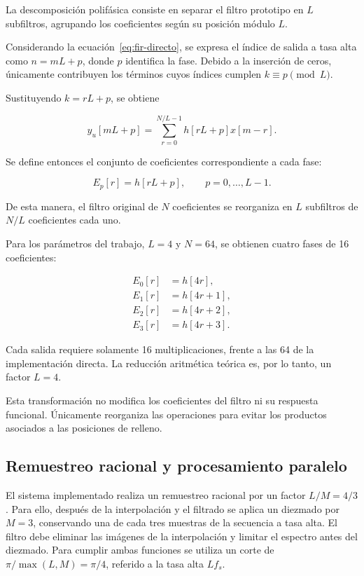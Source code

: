 \documentclass[10pt,a4paper]{article}
\begin{document}
La descomposición polifásica consiste en separar el filtro prototipo
en $L$ subfiltros, agrupando los coeficientes según su posición
módulo $L$.

Considerando la ecuación~\eqref{eq:fir-directo}, se expresa el índice
de salida a tasa alta como $n=mL+p$, donde $p$ identifica la fase.
Debido a la inserción de ceros, únicamente contribuyen los términos
cuyos índices cumplen $k \equiv p \pmod L$.

Sustituyendo $k=rL+p$, se obtiene

\begin{equation}
y_u[mL+p]=
\sum_{r=0}^{N/L-1}h[rL+p]x[m-r].
\label{eq:polyphase}
\end{equation}

Se define entonces el conjunto de coeficientes correspondiente a
cada fase:

\begin{equation}
E_p[r]=h[rL+p],
\qquad p=0,\ldots,L-1.
\label{eq:phase-coefficients}
\end{equation}

De esta manera, el filtro original de $N$ coeficientes se reorganiza
en $L$ subfiltros de $N/L$ coeficientes cada uno.

Para los parámetros del trabajo, $L=4$ y $N=64$, se obtienen cuatro
fases de 16 coeficientes:

\begin{align}
E_0[r] &= h[4r], \nonumber\\
E_1[r] &= h[4r+1], \nonumber\\
E_2[r] &= h[4r+2], \nonumber\\
E_3[r] &= h[4r+3].
\label{eq:four-phases}
\end{align}

Cada salida requiere solamente 16 multiplicaciones, frente a las
64 de la implementación directa. La reducción aritmética teórica
es, por lo tanto, un factor $L=4$.

Esta transformación no modifica los coeficientes del filtro ni
su respuesta funcional. Únicamente reorganiza las operaciones
para evitar los productos asociados a las posiciones de relleno.

\subsection{Remuestreo racional y procesamiento paralelo}

El sistema implementado realiza un remuestreo racional por un factor
$L/M=4/3$. Para ello, después de la interpolación y el filtrado se
aplica un diezmado por $M=3$, conservando una de cada tres muestras
de la secuencia a tasa alta. El filtro debe eliminar las imágenes de la
interpolación y limitar el espectro antes del diezmado. Para cumplir ambas
funciones se utiliza un corte de $\pi/\max(L,M)=\pi/4$, referido a la tasa
alta $Lf_s$.
\end{document}
